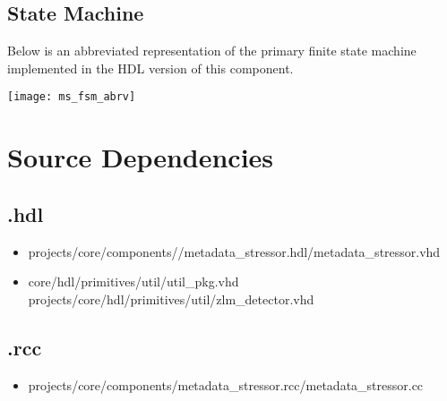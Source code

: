\subsection*{State Machine}
\begin{flushleft}
Below is an abbreviated representation of the primary finite state machine implemented in the HDL version of this component.
\end{flushleft}
\begin{center}
	\centering\captionsetup{type=figure}\texttt{[image: ms\_fsm\_abrv]}
\end{center}

\section*{Source Dependencies}
\subsection*{\comp.hdl}
\begin{itemize}
	\item projects/core/components//metadata\_stressor.hdl/metadata\_stressor.vhd
	\item core/hdl/primitives/util/util\_pkg.vhd
	      \subitem projects/core/hdl/primitives/util/zlm\_detector.vhd
\end{itemize}

\subsection*{\comp.rcc}
\begin{itemize}
	\item projects/core/components/metadata\_stressor.rcc/metadata\_stressor.cc
\end{itemize}

